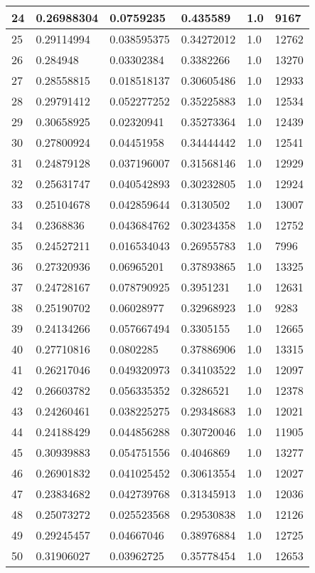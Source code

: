 \begin{longtable}{|l|l|l|l|l|l|}
24 & 0.26988304 & 0.0759235 & 0.435589 & 1.0 & 9167 \\ \hline 
25 & 0.29114994 & 0.038595375 & 0.34272012 & 1.0 & 12762 \\ \hline 
26 & 0.284948 & 0.03302384 & 0.3382266 & 1.0 & 13270 \\ \hline 
27 & 0.28558815 & 0.018518137 & 0.30605486 & 1.0 & 12933 \\ \hline 
28 & 0.29791412 & 0.052277252 & 0.35225883 & 1.0 & 12534 \\ \hline 
29 & 0.30658925 & 0.02320941 & 0.35273364 & 1.0 & 12439 \\ \hline 
30 & 0.27800924 & 0.04451958 & 0.34444442 & 1.0 & 12541 \\ \hline 
31 & 0.24879128 & 0.037196007 & 0.31568146 & 1.0 & 12929 \\ \hline 
32 & 0.25631747 & 0.040542893 & 0.30232805 & 1.0 & 12924 \\ \hline 
33 & 0.25104678 & 0.042859644 & 0.3130502 & 1.0 & 13007 \\ \hline 
34 & 0.2368836 & 0.043684762 & 0.30234358 & 1.0 & 12752 \\ \hline 
35 & 0.24527211 & 0.016534043 & 0.26955783 & 1.0 & 7996 \\ \hline 
36 & 0.27320936 & 0.06965201 & 0.37893865 & 1.0 & 13325 \\ \hline 
37 & 0.24728167 & 0.078790925 & 0.3951231 & 1.0 & 12631 \\ \hline 
38 & 0.25190702 & 0.06028977 & 0.32968923 & 1.0 & 9283 \\ \hline 
39 & 0.24134266 & 0.057667494 & 0.3305155 & 1.0 & 12665 \\ \hline 
40 & 0.27710816 & 0.0802285 & 0.37886906 & 1.0 & 13315 \\ \hline 
41 & 0.26217046 & 0.049320973 & 0.34103522 & 1.0 & 12097 \\ \hline 
42 & 0.26603782 & 0.056335352 & 0.3286521 & 1.0 & 12378 \\ \hline 
43 & 0.24260461 & 0.038225275 & 0.29348683 & 1.0 & 12021 \\ \hline 
44 & 0.24188429 & 0.044856288 & 0.30720046 & 1.0 & 11905 \\ \hline 
45 & 0.30939883 & 0.054751556 & 0.4046869 & 1.0 & 13277 \\ \hline 
46 & 0.26901832 & 0.041025452 & 0.30613554 & 1.0 & 12027 \\ \hline 
47 & 0.23834682 & 0.042739768 & 0.31345913 & 1.0 & 12036 \\ \hline 
48 & 0.25073272 & 0.025523568 & 0.29530838 & 1.0 & 12126 \\ \hline 
49 & 0.29245457 & 0.04667046 & 0.38976884 & 1.0 & 12725 \\ \hline 
50 & 0.31906027 & 0.03962725 & 0.35778454 & 1.0 & 12653 \\ \hline 
\end{longtable}